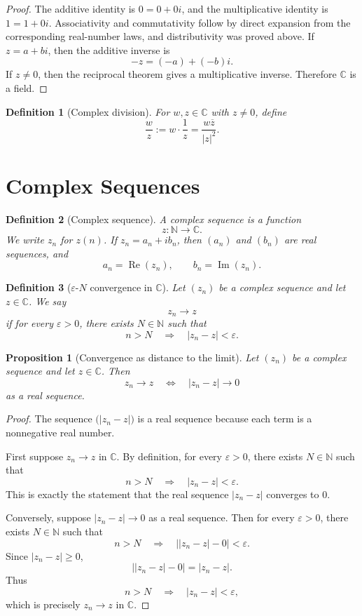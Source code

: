 \documentclass[11pt]{article}
\newtheorem{definition}{Definition}[section]
\newtheorem{proposition}{Proposition}[section]
\newcommand{\C}{\mathbb{C}}
\newcommand{\N}{\mathbb{N}}
\newcommand{\abs}[1]{\left|#1\right|}
\newcommand{\conj}[1]{\overline{#1}}
\newcommand{\Real}{\operatorname{Re}}
\newcommand{\Imag}{\operatorname{Im}}
\begin{document}
\begin{proof}
The additive identity is $0=0+0i$, and the multiplicative identity is $1=1+0i$.
Associativity and commutativity follow by direct expansion from the corresponding real-number laws, and distributivity was proved above.
If $z=a+bi$, then the additive inverse is
\[
  -z=(-a)+(-b)i.
\]
If $z\ne0$, then the reciprocal theorem gives a multiplicative inverse.
Therefore $\C$ is a field.
\end{proof}

\begin{definition}[Complex division]
For $w,z\in\C$ with $z\ne0$, define
\[
  \frac{w}{z}:=w\cdot\frac{1}{z}
  =\frac{w\conj{z}}{\abs{z}^{2}}.
\]
\end{definition}

\section{Complex Sequences}

\begin{definition}[Complex sequence]
A complex sequence is a function
\[
  z:\N\to\C.
\]
We write $z_{n}$ for $z(n)$.
If $z_{n}=a_{n}+ib_{n}$, then $(a_{n})$ and $(b_{n})$ are real sequences, and
\[
  a_{n}=\Real(z_{n}),
  \qquad
  b_{n}=\Imag(z_{n}).
\]
\end{definition}

\begin{definition}[$\varepsilon$-$N$ convergence in $\C$]
Let $(z_{n})$ be a complex sequence and let $z\in\C$.
We say
\[
  z_{n}\to z
\]
if for every $\varepsilon>0$, there exists $N\in\N$ such that
\[
  n>N \quad\Longrightarrow\quad \abs{z_{n}-z}<\varepsilon.
\]
\end{definition}

\begin{proposition}[Convergence as distance to the limit]
Let $(z_{n})$ be a complex sequence and let $z\in\C$.
Then
\[
  z_{n}\to z
  \quad\Longleftrightarrow\quad
  \abs{z_{n}-z}\to0
\]
as a real sequence.
\end{proposition}

\begin{proof}
The sequence $\bigl(\abs{z_{n}-z}\bigr)$ is a real sequence because each term is a nonnegative real number.

First suppose $z_{n}\to z$ in $\C$.
By definition, for every $\varepsilon>0$, there exists $N\in\N$ such that
\[
  n>N\quad\Longrightarrow\quad \abs{z_{n}-z}<\varepsilon.
\]
This is exactly the statement that the real sequence $\abs{z_{n}-z}$ converges to $0$.

Conversely, suppose $\abs{z_{n}-z}\to0$ as a real sequence.
Then for every $\varepsilon>0$, there exists $N\in\N$ such that
\[
  n>N\quad\Longrightarrow\quad
  \bigl|\abs{z_{n}-z}-0\bigr|<\varepsilon.
\]
Since $\abs{z_{n}-z}\ge0$,
\[
  \bigl|\abs{z_{n}-z}-0\bigr|=\abs{z_{n}-z}.
\]
Thus
\[
  n>N\quad\Longrightarrow\quad \abs{z_{n}-z}<\varepsilon,
\]
which is precisely $z_{n}\to z$ in $\C$.
\end{proof}
\end{document}
